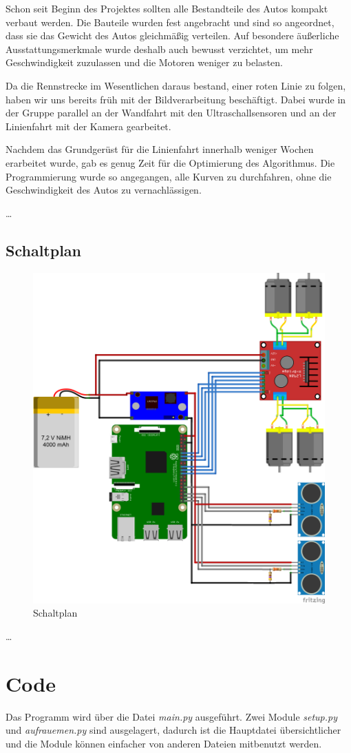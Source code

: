 \documentclass[a4paper, 12pt]{scrartcl}
\begin{document}
Schon seit Beginn des Projektes sollten alle Bestandteile des Autos kompakt verbaut werden. Die Bauteile wurden fest angebracht und sind so angeordnet, dass sie das Gewicht des Autos gleichmäßig verteilen. Auf besondere äußerliche Ausstattungsmerkmale wurde deshalb auch bewusst verzichtet, um mehr Geschwindigkeit zuzulassen und die Motoren weniger zu belasten.

Da die Rennstrecke im Wesentlichen daraus bestand, einer roten Linie zu folgen, haben wir uns bereits früh mit der Bildverarbeitung beschäftigt. Dabei wurde in der Gruppe parallel an der Wandfahrt mit den Ultraschallsensoren und an der Linienfahrt mit der Kamera gearbeitet.

Nachdem das Grundgerüst für die Linienfahrt innerhalb weniger Wochen erarbeitet wurde, gab es genug Zeit für die Optimierung des Algorithmus. Die Programmierung wurde so angegangen, alle Kurven zu durchfahren, ohne die Geschwindigkeit des Autos zu vernachlässigen.

\ldots

\subsection{Schaltplan}

\begin{figure}[H] 
	\centering
	\includegraphics[width=.5\textwidth]{Schaltplan_Steckplatine.png}
	\caption{Schaltplan}
	\label{schaltplan}
\end{figure}

\ldots

\section{Code}

Das Programm wird über die Datei \textit{main.py} ausgeführt. Zwei Module \textit{setup.py} und \textit{aufrauemen.py} sind ausgelagert, dadurch ist die Hauptdatei übersichtlicher und die Module können einfacher von anderen Dateien mitbenutzt werden.
\end{document}
